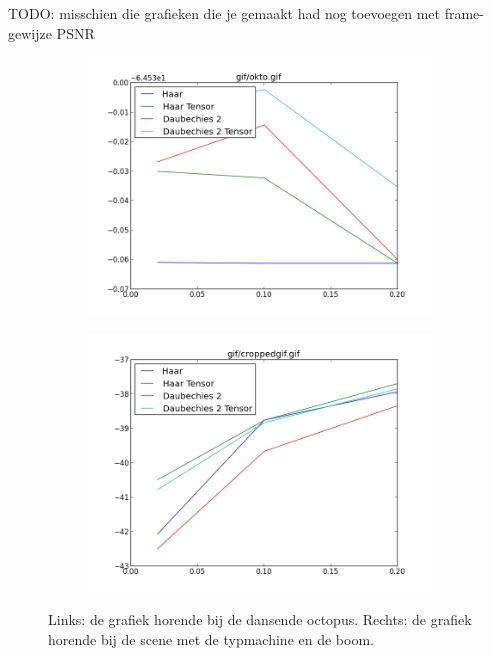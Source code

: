 TODO: misschien die grafieken die je gemaakt had nog toevoegen met frame-gewijze PSNR

\begin{figure}[h]
\centering
\begin{subfigure}[t]{0.48\textwidth}
\includegraphics[width=\linewidth]{plaatjes/cockto.png}
\end{subfigure}
\begin{subfigure}[t]{0.48\textwidth}
\includegraphics[width=\linewidth]{plaatjes/croppedgif.png}
\end{subfigure}
\caption{Links: de grafiek horende bij de dansende octopus. Rechts: de grafiek horende bij de scene met de typmachine en de boom.}
\label{fig:cockto}
\end{figure}

